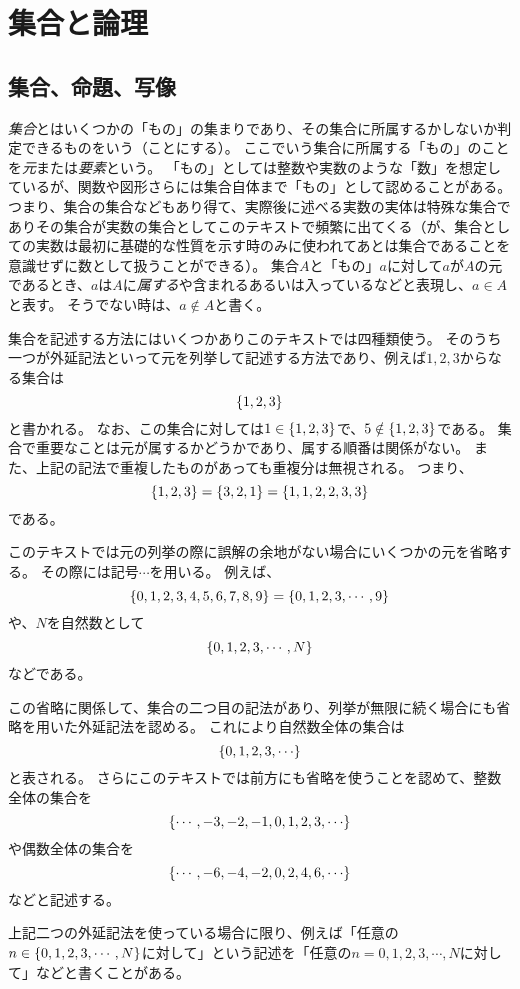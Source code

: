 
\chapter{集合と論理}

\section{集合、命題、写像}

\emph{集合}とはいくつかの「もの」の集まりであり、その集合に所属するかしないか判定できるものをいう（ことにする）。
ここでいう集合に所属する「もの」のことを\emph{元}または\emph{要素}という。
「もの」としては整数や実数のような「数」を想定しているが、関数や図形さらには集合自体まで「もの」として認めることがある。
つまり、集合の集合などもあり得て、実際後に述べる実数の実体は特殊な集合でありその集合が実数の集合としてこのテキストで頻繁に出てくる（が、集合としての実数は最初に基礎的な性質を示す時のみに使われてあとは集合であることを意識せずに数として扱うことができる）。
集合$A$と「もの」$a$に対して$a$が$A$の元であるとき、$a$は$A$に\emph{属する}や含まれるあるいは入っているなどと表現し、$a \in A$と表す。
そうでない時は、$a \notin A$と書く。

集合を記述する方法にはいくつかありこのテキストでは四種類使う。
そのうち一つが外延記法といって元を列挙して記述する方法であり、例えば$1, 2, 3$からなる集合は
$$
\{ 1, 2, 3 \}
$$
と書かれる。
なお、この集合に対しては$1 \in \{ 1, 2, 3 \}$で、$5 \notin \{ 1, 2, 3 \}$である。
集合で重要なことは元が属するかどうかであり、属する順番は関係がない。
また、上記の記法で重複したものがあっても重複分は無視される。
つまり、
$$
\{ 1, 2, 3 \} = \{ 3, 2, 1 \} = \{ 1, 1, 2, 2, 3, 3 \}
$$
である。

このテキストでは元の列挙の際に誤解の余地がない場合にいくつかの元を省略する。
その際には記号$\cdots$を用いる。
例えば、
$$
\{ 0, 1, 2, 3, 4, 5, 6, 7, 8, 9 \} = \{ 0, 1, 2, 3, \cdots, 9 \}
$$
や、$N$を自然数として
$$
\{ 0, 1, 2, 3, \cdots, N \}
$$
などである。

この省略に関係して、集合の二つ目の記法があり、列挙が無限に続く場合にも省略を用いた外延記法を認める。
これにより自然数全体の集合は
$$
\lrset{ 0, 1, 2, 3, \cdots }
$$
と表される。
さらにこのテキストでは前方にも省略を使うことを認めて、整数全体の集合を
$$
\lrset{ \cdots, -3, -2, -1, 0, 1, 2, 3, \cdots }
$$
や偶数全体の集合を
$$
\lrset{ \cdots, -6, -4, -2, 0, 2, 4, 6, \cdots }
$$
などと記述する。

上記二つの外延記法を使っている場合に限り、例えば「任意の$n \in \{ 0, 1, 2, 3, \cdots, N \}$に対して」という記述を「任意の$n = 0, 1, 2, 3, \cdots, N$に対して」などと書くことがある。

